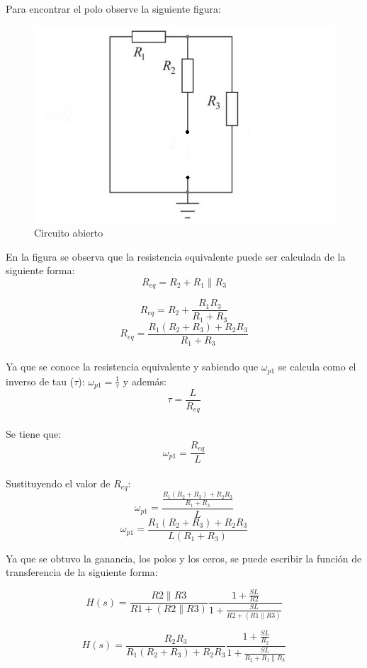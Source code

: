 \documentclass[letterpaper,12pt]{article}
\begin{document}
 Para encontrar el polo observe la siguiente figura:
 
\begin{figure}[!h]
	\centering
	\includegraphics[scale=0.5]{F_3}
	\caption{Circuito abierto}
\end{figure}

En la figura se observa que la resistencia equivalente puede ser calculada de la siguiente forma:
$$R_{eq}=R_2+R_1{\parallel}R_3$$

$$R_{eq}=R_2+\frac{R_1R_3}{R_1+R_3}$$
$$R_{eq}=\frac{R_1(R_2+R_3)+R_2R_3}{R_1+R_3}$$ \\
Ya que se conoce la resistencia equivalente y sabiendo que $\omega_{p1}$ se calcula como el inverso de tau ($\tau$): $\omega_{p1}=\frac{1}{\tau}$ y además:
$$\tau=\frac{L}{R_{eq}}$$\\
Se tiene que:
$$\omega_{p1}=\frac{R_{eq}}{L}$$\\
Sustituyendo el valor de $R_{eq}$:
$$\omega_{p1}=\frac{\frac{R_1(R_2+R_3)+R_2R_3}{R_1+R_3}}{L}$$
$$\omega_{p1}=\frac{R_1(R_2+R_3)+R_2R_3}{L(R_1+R_3)}$$

Ya que se obtuvo la ganancia, los polos y los ceros, se puede escribir la función de transferencia de la siguiente forma:

$$H(s)=\frac{R2\parallel R3}{R1+(R2\parallel R3)}\frac{1+\frac{SL}{R2}}{1+\frac{SL}{R2+(R1\parallel R3)}}$$

$$H(s)=\frac{R_2R_3}{R_1(R_2+R_3)+R_2R_3}\frac{1+\frac{SL}{R_2}}{1+\frac{SL}{R_2+R_1\parallel R_3}}$$
\end{document}
